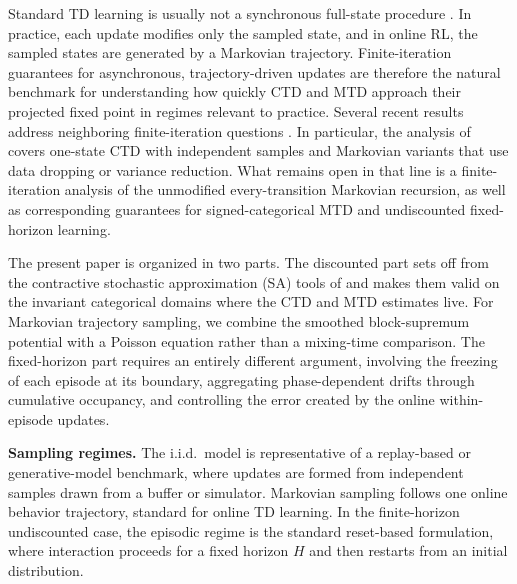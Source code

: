 \documentclass{article}
\begin{document}
Standard TD learning is usually not a synchronous full-state procedure \citep{sutton1988learning,sutton1998reinforcement,tsitsiklis1996analysis,borkar1998asynchronous}. In practice, each update modifies only the sampled state, and in online RL, the sampled states are generated by a Markovian trajectory. Finite-iteration guarantees for asynchronous, trajectory-driven updates are therefore the natural benchmark for understanding how quickly CTD and MTD approach their projected fixed point in regimes relevant to practice. Several recent results address neighboring finite-iteration questions \citep{qu2020finite,bhandari2018finite,srikant2019finite,patil2023finite,dalal2018finite,peng2024statistical,boeck2022speedy, zhang2023estimation, rowland2024near, peng2025finite}. In particular, the analysis of \citet{peng2025statisticalefficiencydistributionaltemporal} covers one-state CTD with independent samples and Markovian variants that use data dropping or variance reduction. What remains open in that line is a finite-iteration analysis of the unmodified every-transition Markovian recursion, as well as corresponding guarantees for signed-categorical MTD and undiscounted fixed-horizon learning.

The present paper is organized in two parts. The discounted part sets off from the contractive stochastic approximation (SA) tools of \citet{chen2020finite,chen2022finite,chen2024lyapunov} and makes them valid on the invariant categorical domains where the CTD and MTD estimates live. For Markovian trajectory sampling, we combine the smoothed block-supremum potential with a Poisson equation rather than a mixing-time comparison. The fixed-horizon part requires an entirely different argument, involving the freezing of each episode at its boundary, aggregating phase-dependent drifts through cumulative occupancy, and controlling the error created by the online within-episode updates.

\noindent\textbf{Sampling regimes.} The i.i.d.\ model is representative of a replay-based or generative-model benchmark, where updates are formed from independent samples drawn from a buffer or simulator. Markovian sampling follows one online behavior trajectory, standard for online TD learning. In the finite-horizon undiscounted case, the episodic regime is the standard reset-based formulation, where interaction proceeds for a fixed horizon $H$ and then restarts from an initial distribution.
\end{document}
